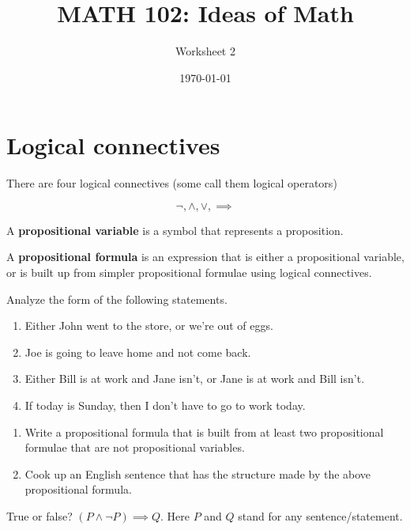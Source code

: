 \documentclass[12pt]{amsart}
\title{ MATH 102: Ideas  of Math }
\author{ Worksheet 2 }
\date{\today}
\begin{document}
\maketitle

\section{ Logical connectives}

There are four logical connectives (some call them logical operators)

$$\neg, \wedge, \vee, \implies$$

\begin{definition}
    A {\bf propositional variable} is a symbol that represents a proposition.
\end{definition}
\begin{definition}
    A {\bf propositional formula} is an expression that is either a propositional 
    variable, or is built up from simpler propositional formulae using logical
    connectives.
\end{definition}

\begin{problem}
Analyze the form of the following statements.

\begin{enumerate}
    \item Either John went to the store, or we’re out of eggs.
    \item  Joe is going to leave home and not come back.
    \item Either Bill is at work and Jane isn’t, or Jane is at work and Bill isn’t.
    \item If today is Sunday, then I don't have to go to work today.
\end{enumerate}
\end{problem}

\begin{problem}
    \begin{enumerate}
        \item Write a propositional formula that is built from at least two propositional formulae that are not propositional variables.
        \item Cook up an English sentence that has the structure made by the above propositional formula.
    \end{enumerate}
\end{problem}

\begin{problem}
    True or false?
    $(P\wedge \neg P) \implies Q$.
    Here $P$ and $Q$ stand for any sentence/statement.
\end{problem}

\printbibliography 
%
%
\end{document}
